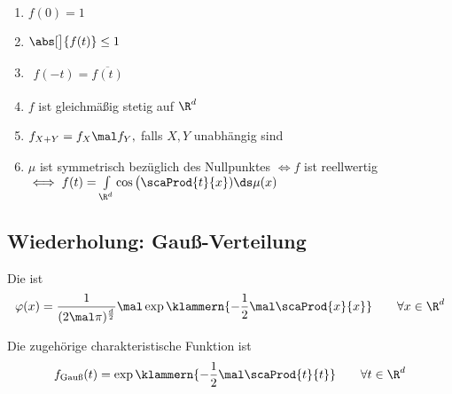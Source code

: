 \begin{lem}\
	\begin{enumerate}
		\item $f(0)=1$
		\item $\begin{aligned}
			\abs[\big]{f(t)}\leq1
		\end{aligned}$
		\item $\begin{aligned}
			f(-t)=\overline{f(t)}
		\end{aligned}$
		\item $f$ ist gleichmäßig stetig auf $\R^d$
		\item $\begin{aligned}
			f_{X+Y}=f_X\mal f_Y,
		\end{aligned}$ falls $X,Y$ unabhängig sind
		\item $\mu$ ist symmetrisch bezüglich des Nullpunktes $\iff f$ ist reellwertig $\iff f(t)=\int\limits_{\R^d}\cos\big(\scaProd{t}{x})\ds\mu(x)$
	\end{enumerate}
\end{lem}

\subsection*{Wiederholung: Gauß-Verteilung}
\begin{defi}
	Die  ist 
	\begin{align*}
		\varphi(x)=\frac{1}{(2\mal\pi)^{\frac{d}{2}}}\mal\exp\klammern{-\frac{1}{2}\mal\scaProd{x}{x}}\qquad\forall x\in\R^d
	\end{align*}
\end{defi}

\begin{lem}
	Die zugehörige charakteristische Funktion ist
	\begin{align*}
		f_{\text{Gauß}}(t)=\exp\klammern{-\frac{1}{2}\mal\scaProd{t}{t}}\qquad\forall t\in\R^d
	\end{align*}
\end{lem}

